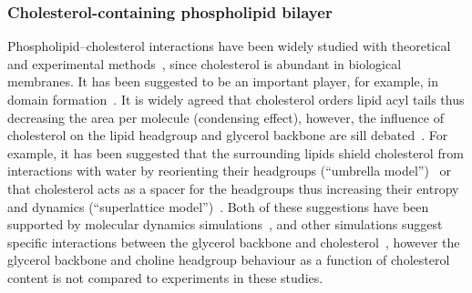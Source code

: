 \documentclass[pre,aps,floatfix,authordate1-4,twocolumn]{revtex4-1}
\begin{document}
\subsubsection{Cholesterol-containing phospholipid bilayer}
Phospholipid--cholesterol interactions have been widely studied with theoretical~\cite{huang99,zhu07,rog09,alwarawrah12} and
experimental methods~\cite{brown78,marsh10,ferreira13,marsh13}, since cholesterol is abundant in biological membranes.
It has been suggested to be an important player, for example, in domain formation~\cite{simons04,somerharju09}.
It is widely agreed that cholesterol orders lipid acyl tails thus decreasing the area per molecule (condensing effect),
however, the influence of cholesterol on the lipid headgroup and glycerol backbone are sill debated~\cite{huang99,simons04,somerharju09}.
For example, it has been suggested that the surrounding lipids shield cholesterol from interactions with water by 
reorienting their headgroups (``umbrella model'')~\cite{huang99} or that cholesterol acts as a spacer for the headgroups thus increasing 
their entropy and dynamics (``superlattice model'')~\cite{somerharju09}. 
Both of these suggestions have been supported
by molecular dynamics simulations~\cite{zhu07,alwarawrah12}, and other simulations suggest specific
interactions between the glycerol backbone and cholesterol~\cite{rog09}, however the glycerol backbone and choline headgroup behaviour
as a function of cholesterol content is not compared to experiments in these studies. 
\end{document}

